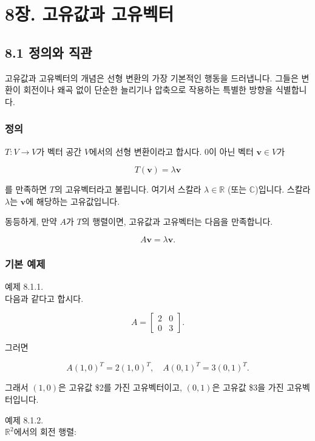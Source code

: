 \documentclass[
  12pt,
  a4paper,
]{article}
\let\oldsection\section
\renewcommand{\section}{\clearpage\oldsection}
\begin{document}
\section{8장. 고유값과 고유벡터}\label{chapter-8-eigenvalues-and-eigenvectors}

\subsection{8.1 정의와 직관}\label{81-definitions-and-intuition}

고유값과 고유벡터의 개념은 선형 변환의 가장 기본적인 행동을 드러냅니다. 그들은 변환이 회전이나 왜곡 없이 단순한 늘리기나 압축으로 작용하는 특별한 방향을 식별합니다.

\subsubsection{정의}\label{definition-5}

\(T: V \to V\)가 벡터 공간 \(V\)에서의 선형 변환이라고 합시다. 0이 아닌 벡터 \(\mathbf{v} \in V\)가

\[T(\mathbf{v}) = \lambda \mathbf{v}\]

를 만족하면 \(T\)의 고유벡터라고 불립니다. 여기서 스칼라 \(\lambda \in \mathbb{R}\) (또는 \(\mathbb{C}\))입니다. 스칼라 \(\lambda\)는 \(\mathbf{v}\)에 해당하는 고유값입니다.

동등하게, 만약 \(A\)가 \(T\)의 행렬이면, 고유값과 고유벡터는 다음을 만족합니다.

\[A\mathbf{v} = \lambda \mathbf{v}.\]

\subsubsection{기본 예제}\label{basic-examples}

예제 8.1.1.\\
다음과 같다고 합시다.

\[A = \begin{bmatrix} 2 & 0 \\ 0 & 3 \end{bmatrix}.\]

그러면

\[A(1,0)^T = 2(1,0)^T, \quad A(0,1)^T = 3(0,1)^T.\]

그래서 \((1,0)\)은 고유값 \$2\)를 가진 고유벡터이고, \((0,1)\)은 고유값 \$3\)을 가진 고유벡터입니다.

예제 8.1.2.\\
\(\mathbb{R}^2\)에서의 회전 행렬:
\end{document}
